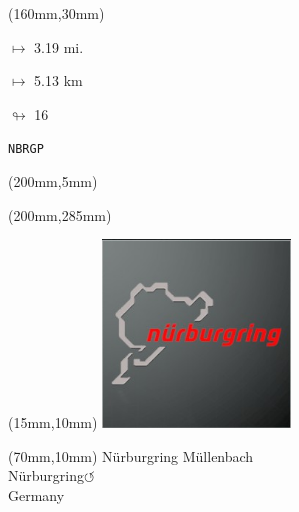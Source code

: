 \begin{textblock*}{40mm}(160mm,30mm)%
\Large
\par$\mapsto$ 3.19 mi.
\par$\mapsto$ 5.13 km
\par$\looparrowright$ 16
\par\hfill\tiny\tt NBRGP\\
\end{textblock*}
\begin{textblock*}{20mm}(200mm,5mm)%
\fbox{\thepage}
\label{NBRGP}
\end{textblock*}
\begin{textblock*}{20mm}(200mm,285mm)%
\fbox{\thepage}
\end{textblock*}

\null\newpage
\begin{textblock*}{50mm}(15mm,10mm)%
\includegraphics[width=50mm]{LG/2015-05-20_00089.png}
\end{textblock*}
\begin{textblock*}{130mm}(70mm,10mm)%
{\fontsize{20}{20}\selectfont Nürburgring Müllenbach\\}
{\fontsize{16}{16}\selectfont Nürburgring\hfill \huge$\circlearrowleft$\\}
{\fontsize{12}{12}\selectfont Germany\\}
\end{textblock*}
